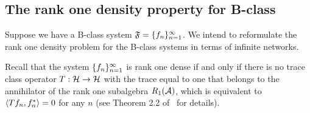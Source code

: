 \documentclass[12pt,oneside,a4paper]{amsart}
\begin{document}



    \medskip
    \subsection{The rank one density property for B-class}
      Suppose we have a B-class system $\fsys=\seq{f}$.
      We intend to reformulate the rank one density problem for the B-class systems in terms of infinite networks.

      Recall that the system $\seq{f}$ is rank one dense
        if and only if there is no trace class operator $T: \cal{H} \to \cal{H}$ with the trace equal to one
        that belongs to the annihilator of the rank one subalgebra $R_1(\cal{A})$, which is equivalent to
        $\inner{Tf_n}{f_n^*} = 0$ for any $n$
        (see Theorem 2.2 of~\cite{katavolos} for details).
\end{document}
